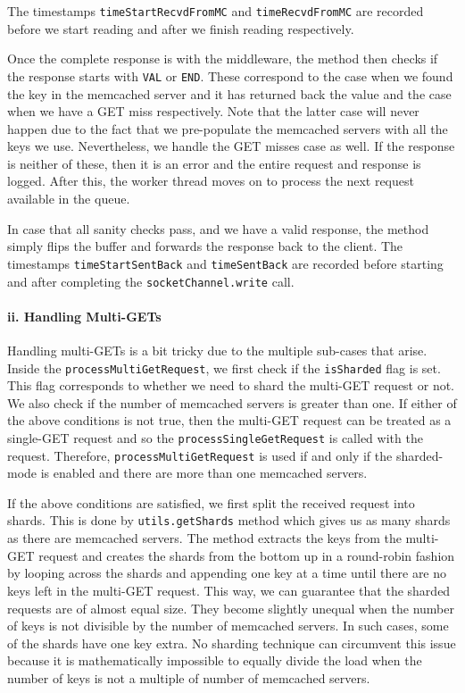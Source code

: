 \documentclass[11pt,a4paper]{article}
\begin{document}
	The timestamps \texttt{timeStartRecvdFromMC} and \texttt{timeRecvdFromMC} are recorded before we start reading and after we finish reading respectively.
	
	Once the complete response is with the middleware, the method then checks if the response starts with \texttt{VAL} or \texttt{END}. These correspond to the case when we found the key in the memcached server and it has returned back the value and the case when we have a GET miss respectively. Note that the latter case will never happen due to the fact that we pre-populate the memcached servers with all the keys we use. Nevertheless, we handle the GET misses case as well. If the response is neither of these, then it is an error and the entire request and response is logged. After this, the worker thread moves on to process the next request available in the queue.
	
	In case that all sanity checks pass, and we have a valid response, the method simply flips the buffer and forwards the response back to the client. The timestamps \texttt{timeStartSentBack} and \texttt{timeSentBack} are recorded before starting and after completing the \texttt{socketChannel.write} call. 
	
	\paragraph{ii. Handling Multi-GETs}
	Handling multi-GETs is a bit tricky due to the multiple sub-cases that arise. Inside the \texttt{processMultiGetRequest}, we first check if the \texttt{isSharded} flag is set. This flag corresponds to whether we need to shard the multi-GET request or not. We also check if the number of memcached servers is greater than one. If either of the above conditions is not true, then the multi-GET request can be treated as a single-GET request and so the \texttt{processSingleGetRequest} is called with the request. Therefore, \texttt{processMultiGetRequest} is used if and only if the sharded-mode is enabled and there are more than one memcached servers.
	
	If the above conditions are satisfied, we first split the received request into shards. This is done by \texttt{utils.getShards} method which gives us as many shards as there are memcached servers. The method extracts the keys from the multi-GET request and creates the shards from the bottom up in a round-robin fashion by looping across the shards and appending one key at a time until there are no keys left in the multi-GET request.
	This way, we can guarantee that the sharded requests are of almost equal size. They become slightly unequal when the number of keys is not divisible by the number of memcached servers. In such cases, some of the shards have one key extra. No sharding technique can circumvent this issue because it is mathematically impossible to equally divide the load when the number of keys is not a multiple of number of memcached servers.
	
\end{document}
